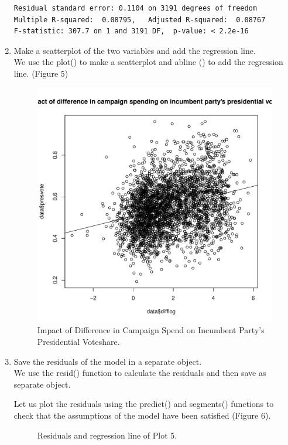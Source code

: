 \documentclass[12pt,letterpaper]{article}
\begin{document}
\begin{enumerate}
\begin{verbatim}
Residual standard error: 0.1104 on 3191 degrees of freedom
Multiple R-squared:  0.08795,	Adjusted R-squared:  0.08767 
F-statistic: 307.7 on 1 and 3191 DF,  p-value: < 2.2e-16
\end{verbatim}
		\item Make a scatterplot of the two variables and add the regression line.\\
\noindent We use the plot() to make a scatterplot and abline () to add the regression line. (Figure 5)\\
  
\vspace{.5cm}   
\begin{figure}[h!]\centering
	\caption{\footnotesize Impact of Difference in Campaign Spend on Incumbent Party's Presidential Voteshare.}
	\label{fig:plot_5}
	\includegraphics[width=.5\textwidth]{plot5_difflog_presvote.pdf}
\end{figure}
\newpage	
		\item Save the residuals of the model in a separate object.\\
\noindent We use the resid() function to calculate the residuals and then save as separate object.\\
\vspace{.5cm}
  
\vspace{.5cm}   
\noindent Let us plot the residuals using the predict() and segments() functions to check that the assumptions of the model have been satisfied (Figure 6).\\
\vspace{.5cm}
  
\vspace{.5cm}   
\begin{figure}[h!]\centering
	\caption{\footnotesize Residuals and regression line of Plot 5.}

\end{figure}
\end{enumerate}
\end{document}
